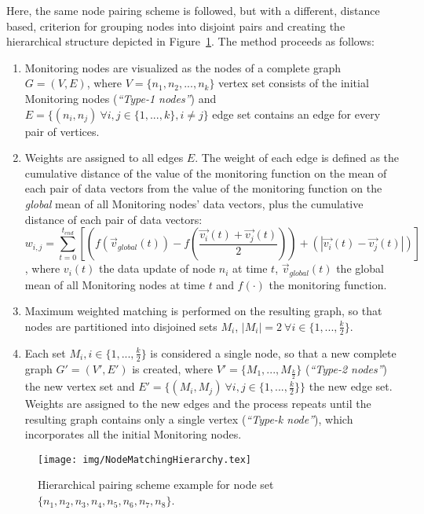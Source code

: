 Here, the same node pairing scheme is followed, but with a different, distance based, criterion for grouping nodes into disjoint pairs and creating the hierarchical structure depicted in Figure~\ref{fig:nodePairHierarchy}. The method proceeds as follows:
\begin{enumerate}
\item Monitoring nodes are visualized as the nodes of a complete graph $G=(V,E)$, where $V=\{n_1, n_2, ... , n_k\}$ vertex set consists of the initial Monitoring nodes (\emph{``Type-1 nodes''}) and $E=\{(n_i, n_j)\ \forall i,j \in \{1, ..., k\}, i \neq j\}$ edge set contains an edge for every pair of vertices.
\item Weights are assigned to all edges $E$. The weight of each edge is defined as the cumulative distance of the value of the monitoring function on the mean of each pair of data vectors from the value of the monitoring function on the \emph{global} mean of all Monitoring nodes' data vectors, plus the cumulative distance of each pair of data vectors:
\begin{equation}
w_{i,j}=
\sum_{t=0}^{t_{end}}{[(f(\vec{v}_{global}(t))-f(\frac{\vec{v_i}(t)+\vec{v_j}(t)}{2}))+(|\vec{v_i}(t)-\vec{v_j}(t)|)]}
\label{form:distanceMatchingWeights}
\end{equation}
, where $v_i(t)$ the data update of node $n_i$ at time $t$, $\vec{v}_{global}(t)$ the global mean of all Monitoring nodes at time $t$ and $f(\cdot)$ the monitoring function.

\item Maximum weighted matching is performed on the resulting graph, so that nodes are partitioned into disjoined sets $M_i$, $|M_i|=2\ \forall i \in \{1, ..., \frac{k}{2}\}$.
\item Each set $M_i, i \in \{1, ..., \frac{k}{2}\}$ is considered a single node, so that a new complete graph $G'=(V', E')$ is created, where $V'=\{M_1, ..., M_{\frac{k}{2}}\}$ (\emph{``Type-2 nodes''}) the new vertex set and $E'=\{(M_i, M_j)\ \forall i,j \in \{1, ..., \frac{k}{2}\}\}$ the new edge set. Weights are assigned to the new edges and the process repeats until the resulting graph contains only a single vertex (\emph{``Type-k node''}), which incorporates all the initial Monitoring nodes. 
\end{enumerate} 

\begin{figure}
\centering
\texttt{[image: img/NodeMatchingHierarchy.tex]}
\caption{Hierarchical pairing scheme example  for node set $\{n_1, n_2, n_3, n_4, n_5, n_6, n_7, n_8\}$.} 
\label{fig:nodePairHierarchy}
\end{figure}


